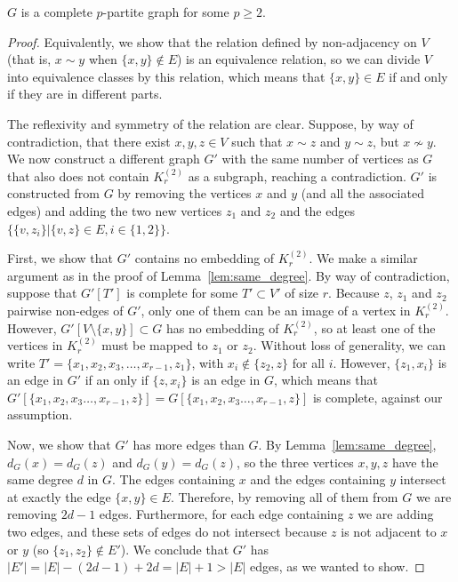\begin{lemma} \label{lem:turan_complete_partite}
    $G$ is a complete $p$-partite graph for some $p \geq 2$.
    \begin{proof}
        Equivalently, we show that the relation defined by non-adjacency on $V$ (that is, $x \sim y$ when
        $\{x, y\} \notin E$) is an equivalence relation, so we can divide $V$ into equivalence classes
        by this relation, which means that $\{x, y\} \in E$ if and only if they are in different parts.

        The reflexivity and symmetry of the relation are clear.
        Suppose, by way of contradiction, that there exist $x, y, z \in V$ such that
        $x \sim z$ and $y \sim z$, but $x \nsim y$.
        We now construct a different graph $G'$ with the same number of vertices as $G$
        that also does not contain $K_r^{(2)}$ as a subgraph, reaching a contradiction.
        $G'$ is constructed from $G$ by removing the vertices
        $x$ and $y$ (and all the associated edges) and adding the two new vertices
        $z_1$ and $z_2$ and the edges $\{\{v, z_i\} | \{v, z\} \in E, i \in \{1, 2\}\}$.

        First, we show that $G'$ contains no embedding of $K_r^{(2)}$.
        We make a similar argument as in the proof of Lemma~\ref{lem:same_degree}.
        By way of contradiction, suppose that $G'[T']$ is complete for some $T' \subset V'$ of size $r$.
        Because $z$, $z_1$ and $z_2$ pairwise non-edges of $G'$, only one of them can be
        an image of a vertex in $K_r^{(2)}$.
        However, $G'[V \setminus \{x, y\}] \subset G$ has no embedding of $K_r^{(2)}$,
        so at least one of the vertices in $K_r^{(2)}$ must be mapped to $z_1$ or $z_2$.
        Without loss of generality, we can write $T' = \{x_1, x_2, x_3, \dots, x_{r-1}, z_1\}$,
        with $x_i \notin \{z_2, z\}$ for all $i$.
        However, $\{z_1, x_i\}$ is an edge in $G'$ if an only if $\{z, x_i\}$ is an edge in $G$,
        which means that $G'[\{x_1, x_2, x_3 \dots, x_{r-1}, z\}] = G[\{x_1, x_2, x_3 \dots, x_{r-1}, z\}]$ is complete,
        against our assumption.

        Now, we show that $G'$ has more edges than $G$.
        By Lemma~\ref{lem:same_degree}, $d_G(x) = d_G(z)$ and $d_G(y) = d_G(z)$,
        so the three vertices $x, y, z$ have the same degree $d$ in $G$.
        The edges containing $x$ and the edges containing $y$ intersect at exactly the edge $\{x, y\} \in E$.
        Therefore, by removing all of them from $G$ we are removing $2d - 1$ edges.
        Furthermore, for each edge containing $z$ we are adding two edges,
        and these sets of edges do not intersect because $z$ is not adjacent to $x$ or $y$ (so $\{z_1, z_2\} \notin E'$).
        We conclude that $G'$ has $|E'| = |E| - (2d - 1) + 2d = |E| + 1 > |E| $ edges, as we wanted to show.
    \end{proof}
\end{lemma}

